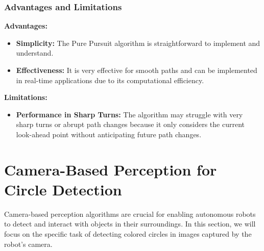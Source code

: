 \documentclass{article}
\begin{document}
	
	\subsubsection*{Advantages and Limitations}
	\textbf{Advantages:}
	\begin{itemize}
		\item \textbf{Simplicity:} The Pure Pursuit algorithm is straightforward to implement and understand.
		\item \textbf{Effectiveness:} It is very effective for smooth paths and can be implemented in real-time applications due to its computational efficiency.
	\end{itemize}
	\textbf{Limitations:}
	\begin{itemize}
		\item \textbf{Performance in Sharp Turns:} The algorithm may struggle with very sharp turns or abrupt path changes because it only considers the current look-ahead point without anticipating future path changes.
	\end{itemize}
	
	
	\section{Camera-Based Perception for Circle Detection}
	Camera-based perception algorithms are crucial for enabling autonomous robots to detect and interact with objects in their surroundings. In this section, we will focus on the specific task of detecting colored circles in images captured by the robot's camera.
	
\end{document}
